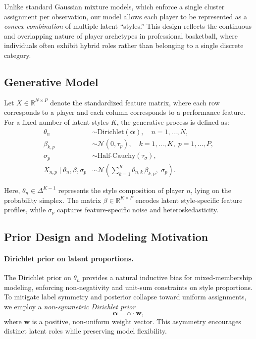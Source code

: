 \documentclass[12pt]{article}
\begin{document}
Unlike standard Gaussian mixture models, which enforce a single cluster assignment per
observation, our model allows each player to be represented as a \emph{convex combination}
of multiple latent ``styles.'' This design reflects the continuous and overlapping nature
of player archetypes in professional basketball, where individuals often exhibit hybrid
roles rather than belonging to a single discrete category.

\vspace{0.5em}

\subsection{Generative Model}

Let $X \in \mathbb{R}^{N \times P}$ denote the standardized feature matrix, where each row
corresponds to a player and each column corresponds to a performance feature.
For a fixed number of latent styles $K$, the generative process is defined as:
\begin{align}
\theta_n &\sim \mathrm{Dirichlet}(\boldsymbol{\alpha}), \quad n = 1, \dots, N, \\
\beta_{k,p} &\sim \mathcal{N}(0, \tau_p), 
\quad k = 1, \dots, K,\; p = 1, \dots, P, \\
\sigma_p &\sim \mathrm{Half\text{-}Cauchy}(\tau_\sigma), \\
X_{n,p} \mid \theta_n, \beta, \sigma_p 
&\sim \mathcal{N}\!\left(
\sum_{k=1}^{K} \theta_{n,k}\,\beta_{k,p},\; \sigma_p
\right).
\end{align}

Here, $\theta_n \in \Delta^{K-1}$ represents the style composition of player $n$,
lying on the probability simplex.
The matrix $\beta \in \mathbb{R}^{K \times P}$ encodes latent style-specific feature
profiles, while $\sigma_p$ captures feature-specific noise and heteroskedasticity.

\vspace{0.5em}

\subsection{Prior Design and Modeling Motivation}

\paragraph{Dirichlet prior on latent proportions.}
The Dirichlet prior on $\theta_n$ provides a natural inductive bias for mixed-membership
modeling, enforcing non-negativity and unit-sum constraints on style proportions.
To mitigate label symmetry and posterior collapse toward uniform assignments, we employ a
\emph{non-symmetric Dirichlet prior}
\[
\boldsymbol{\alpha} = \alpha \cdot \mathbf{w},
\]
where $\mathbf{w}$ is a positive, non-uniform weight vector.
This asymmetry encourages distinct latent roles while preserving model flexibility.
\end{document}
